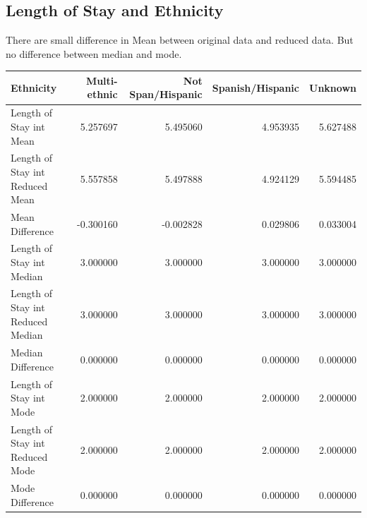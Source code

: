 \documentclass[
	letterpaper, %
]{jdf}
\begin{document}
\subsection{Length of Stay and Ethnicity}
There are small difference in Mean between original data and reduced data. But no difference between median and mode.  
\begin{jdftable}
\label{table:Example}
\small %
\begin{tabular}{@{} lrrrr}
\textbf{Ethnicity} & \textbf{Multi-ethnic} &\textbf{Not Span/Hispanic} & \textbf{Spanish/Hispanic} &\textbf{Unknown}\\
	\toprule[0.5pt]
Length of Stay int Mean           &      5.257697 &           5.495060 &          4.953935 &  5.627488 \\ \midrule
Length of Stay int Reduced Mean   &      5.557858 &           5.497888 &          4.924129 &  5.594485 \\\midrule
Mean Difference                   &     -0.300160 &          -0.002828 &          0.029806 &  0.033004 \\\midrule
Length of Stay int Median         &      3.000000 &           3.000000 &          3.000000 &  3.000000 \\\midrule
Length of Stay int Reduced Median &      3.000000 &           3.000000 &          3.000000 &  3.000000 \\\midrule
Median Difference                 &      0.000000 &           0.000000 &          0.000000 &  0.000000 \\\midrule
Length of Stay int Mode           &      2.000000 &           2.000000 &          2.000000 &  2.000000 \\\midrule
Length of Stay int Reduced Mode   &      2.000000 &           2.000000 &          2.000000 &  2.000000 \\\midrule
Mode Difference                   &      0.000000 &           0.000000 &          0.000000 &  0.000000 \\
\end{tabular}
\end{jdftable}
\end{document}
